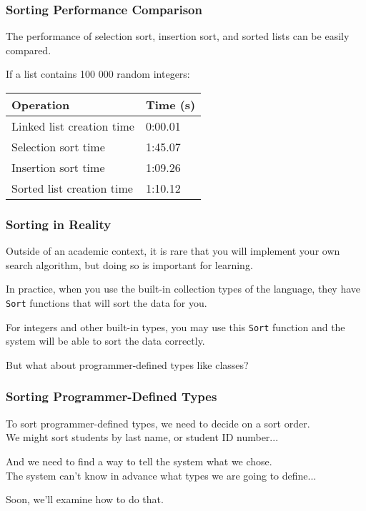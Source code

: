 \begin{frame}
\frametitle{Sorting Performance Comparison}

The performance of selection sort, insertion sort, and sorted lists can be easily compared.

If a list contains 100 000 random integers:
\begin{center}
\begin{tabular}{l|l}
\textbf{Operation} & \textbf{Time (s)}\\ \hline
Linked list creation time & 0:00.01\\ \hline
Selection sort time		& 1:45.07\\ \hline
Insertion sort time		& 1:09.26\\ \hline
Sorted list creation time	& 1:10.12\\
\end{tabular}
\end{center}

\end{frame}

\begin{frame}
\frametitle{Sorting in Reality}
Outside of an academic context, it is rare that you will implement your own search algorithm, but doing so is important for learning.

In practice, when you use the built-in collection types of the language, they have \texttt{Sort} functions that will sort the data for you.

For integers and other built-in types, you may use this \texttt{Sort} function and the system will be able to sort the data correctly.

But what about programmer-defined types like classes?

\end{frame}


\begin{frame}
\frametitle{Sorting Programmer-Defined Types}
To sort programmer-defined types, we need to decide on a sort order.\\
\quad We might sort students by last name, or student ID number... 

And we need to find a way to tell the system what we chose.\\
The system can't know in advance what types we are going to define...

Soon, we'll examine how to do that.
\end{frame}






